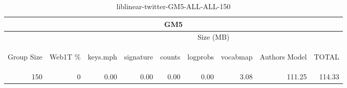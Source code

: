 \begin{center}
\begin{table}[htbp] 
 \begin{center}
\begin{tabular}{ | r | r | r | r | r | r | r | r | r |}
\hline
\multicolumn{9}{|c|}{GM5}\\
\hline
 & & \multicolumn{7}{|c|}{Size (MB)}\\ \cline{3-9}
\begin{sideways}Group Size\end{sideways} & \begin{sideways}Web1T \% \end{sideways} & \begin{sideways}keys.mph\end{sideways} & \begin{sideways}signature\end{sideways} & \begin{sideways}counts\end{sideways} & \begin{sideways}logprobs\end{sideways} & \begin{sideways}vocabmap\end{sideways} & \begin{sideways}Authors Model \end{sideways} & \begin{sideways}TOTAL\end{sideways}\\
\hline
\multirow{0}{*}{150}
 & 0 & 0.00 & 0.00 & 0.00 & 0.00 & 3.08 & 111.25 & 114.33\\ \cline{2-9}
\hline
\end{tabular}
\caption{liblinear-twitter-GM5-ALL-ALL-150}
\label{table:liblinear-twitter-GM5-ALL-ALL-150}
\end{center}
 \end{table}
\end{center}

